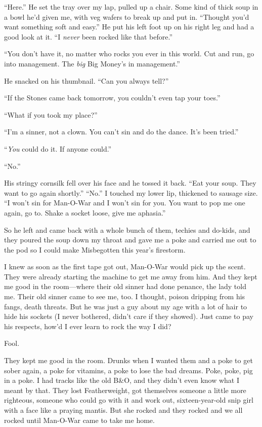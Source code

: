 ``Here.'' He set the tray over my lap, pulled up a chair. Some kind of thick soup in a bowl he'd given me, with veg wafers to break up and put in. ``Thought you'd want something soft and easy.'' He put his left foot up on his right leg and had a good look at it. ``I \textit{never} been rocked like that before.''

``You don't have it, no matter who rocks you ever in this world. Cut and run, go into management. The \textit{big} Big Money's in management.''

He snacked on his thumbnail. ``Can you always tell?''

``If the Stones came back tomorrow, you couldn't even tap your toes.''

``What if you took my place?''

``I'm a sinner, not a clown. You can't sin and do the dance. It's been tried.''

``\textit{You} could do it. If anyone could.''

``No.''

His stringy cornsilk fell over his face and he tossed it back. ``Eat your soup. They want to go again shortly.''
``No.'' I touched my lower lip, thickened to sausage size. ``I won't sin for Man-O-War and I won't sin for you. You want to pop me one again, go to. Shake a socket loose, give me aphasia.''

So he left and came back with a whole bunch of them, techies and do-kids, and they poured the soup down my throat and gave me a poke and carried me out to the pod so I could make Misbegotten this year's firestorm.

I knew as soon as the first tape got out, Man-O-War would pick up the scent. They were already starting the machine to get me away from him. And they kept me good in the room—where their old sinner had done penance, the lady told me. Their old sinner came to see me, too. I thought, poison dripping from his fangs, death threats. But he was just a guy about my age with a lot of hair to hide his sockets (I never bothered, didn't care if they showed). Just came to pay his respects, how'd I ever learn to rock the way I did?

Fool.

They kept me good in the room. Drunks when I wanted them and a poke to get sober again, a poke for vitamins, a poke to lose the bad dreams. Poke, poke, pig in a poke. I had tracks like the old B\&O, and they didn't even know what I meant by that. They lost Featherweight, got themselves someone a little more righteous, someone who could go with it and work out, sixteen-year-old snip girl with a face like a praying mantis. But she rocked and they rocked and we all rocked until Man-O-War came to take me home.

